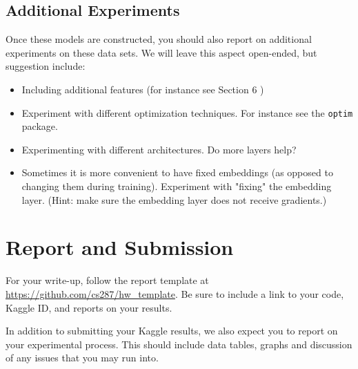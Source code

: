 \documentclass[11pt]{article}
\begin{document}
\subsection{Additional Experiments}

Once these models are constructed, you should also report on
additional experiments on these data sets. We will leave this aspect
open-ended, but suggestion include:

\begin{itemize}
\item Including additional features (for instance see Section 6 \citep{collobert2011natural})
\item Experiment with different optimization techniques. For instance see the \texttt{optim} package. 
\item Experimenting with different architectures. Do more layers help? 
\item Sometimes it is more convenient to have fixed embeddings (as opposed to changing them during training). Experiment with "fixing" the embedding layer. (Hint: make sure the embedding layer does not receive gradients.)
\end{itemize}

\section{Report and Submission}

For your write-up, follow the report template at
\url{https://github.com/cs287/hw_template}. Be sure to include a link
to your code, Kaggle ID, and reports on your results.

In addition to submitting your Kaggle results, we also expect you to report on your 
experimental process. This should include data tables, graphs and discussion of any 
issues that you may run into. 

 

\end{document}
